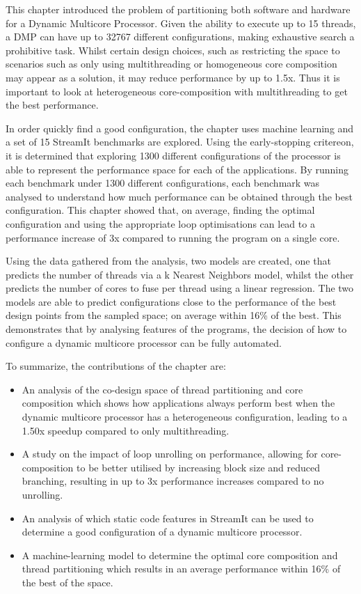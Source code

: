 This chapter introduced the problem of partitioning both software and hardware for a Dynamic Multicore Processor.
Given the ability to execute up to 15 threads, a DMP can have up to 32767 different configurations, making exhaustive search a prohibitive task.
Whilst certain design choices, such as restricting the space to scenarios such as only using multithreading or homogeneous core composition may appear as a solution, it may reduce performance by up to 1.5x.
Thus it is important to look at heterogeneous core-composition with multithreading to get the best performance.

In order quickly find a good configuration, the chapter uses machine learning and a set of 15 StreamIt benchmarks are explored.
Using the early-stopping critereon, it is determined that exploring 1300 different configurations of the processor is able to represent the performance space for each of the applications.
By running each benchmark under 1300 different configurations, each benchmark was analysed to understand how much performance can be obtained through the best configuration.
This chapter showed that, on average, finding the optimal configuration and using the appropriate loop optimisations can lead to a performance increase of 3x compared to running the program on a single core.

Using the data gathered from the analysis, two models are created, one that predicts the number of threads via a k Nearest Neighbors model, whilst the other predicts the number of cores to fuse per thread using a linear regression.
The two models are able to predict configurations close to the performance of the best design points from the sampled space; on average within 16\% of the best.
This demonstrates that by analysing features of the programs, the decision of how to configure a dynamic multicore processor can be fully automated.

To summarize, the contributions of the chapter are:
\begin{itemize}
\item An analysis of the co-design space of thread partitioning and core composition which shows how applications always perform best when the dynamic multicore processor has a heterogeneous configuration, leading to a 1.50x speedup compared to only multithreading.
\vspace{-0.5em}
\item A study on the impact of loop unrolling on performance, allowing for core-composition to be better utilised by increasing block size and reduced branching, resulting in up to 3x performance increases compared to no unrolling.
\vspace{-0.5em}
\item An analysis of which static code features in StreamIt can be used to determine a good configuration of a dynamic multicore processor.
\vspace{-0.5em}
\item A machine-learning model to determine the optimal core composition and thread partitioning which results in an average performance within 16\% of the best of the space.
\end{itemize}
